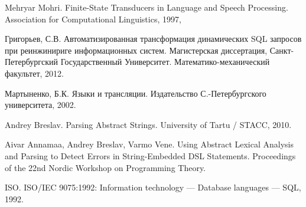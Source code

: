 \begin{thebibliography}{99}
Mehryar Mohri. Finite-State Transducers in Language and Speech Processing.
Association for Computational Linguistics, 1997,

Григорьев, С.В. Автоматизированная трансформация динамических SQL запросов при реинжинириге информационных систем.
Магистерская диссертация, Санкт-Петербургский Государственный Университет. Математико-механический факультет, 2012.

Мартыненко, Б.К. Языки и трансляции. Издательство С.-Петербургского университета, 2002.

Andrey Breslav. Parsing Abstract Strings. University of Tartu / STACC, 2010.

Aivar Annamaa, Andrey Breslav, Varmo Vene.
Using Abstract Lexical Analysis and Parsing to Detect Errors in String-Embedded DSL Statements.
Proceedings of the 22nd Nordic Workshop on Programming Theory.

ISO. ISO/IEC 9075:1992: Information technology — Database languages — SQL, 1992.
\end{thebibliography}
